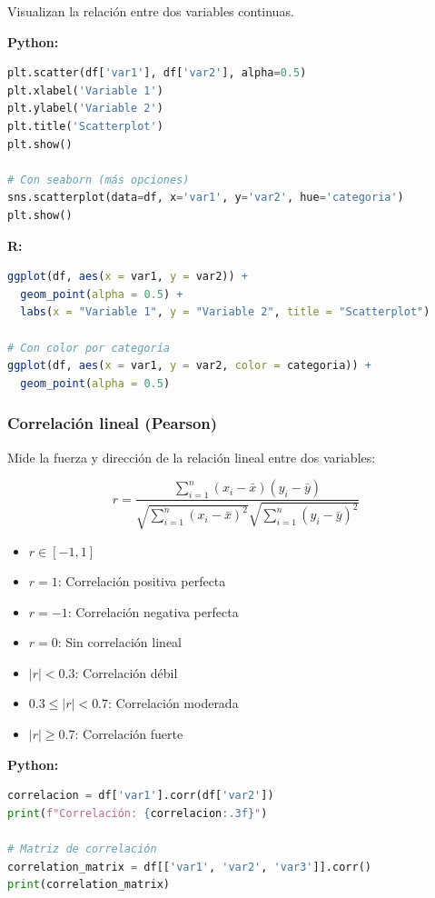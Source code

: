 \documentclass[a4paper,11pt]{article}
\begin{document}
Visualizan la relación entre dos variables continuas.

\textbf{Python:}
\begin{lstlisting}[language=Python]
plt.scatter(df['var1'], df['var2'], alpha=0.5)
plt.xlabel('Variable 1')
plt.ylabel('Variable 2')
plt.title('Scatterplot')
plt.show()

# Con seaborn (más opciones)
sns.scatterplot(data=df, x='var1', y='var2', hue='categoria')
plt.show()
\end{lstlisting}

\textbf{R:}
\begin{lstlisting}[language=R]
ggplot(df, aes(x = var1, y = var2)) +
  geom_point(alpha = 0.5) +
  labs(x = "Variable 1", y = "Variable 2", title = "Scatterplot")

# Con color por categoría
ggplot(df, aes(x = var1, y = var2, color = categoria)) +
  geom_point(alpha = 0.5)
\end{lstlisting}

\subsubsection{Correlación lineal (Pearson)}

Mide la fuerza y dirección de la relación lineal entre dos variables:

$$r = \frac{\sum_{i=1}^{n}(x_i - \bar{x})(y_i - \bar{y})}{\sqrt{\sum_{i=1}^{n}(x_i - \bar{x})^2}\sqrt{\sum_{i=1}^{n}(y_i - \bar{y})^2}}$$

\begin{itemize}
    \item $r \in [-1, 1]$
    \item $r = 1$: Correlación positiva perfecta
    \item $r = -1$: Correlación negativa perfecta
    \item $r = 0$: Sin correlación lineal
    \item $|r| < 0.3$: Correlación débil
    \item $0.3 \leq |r| < 0.7$: Correlación moderada
    \item $|r| \geq 0.7$: Correlación fuerte
\end{itemize}

\textbf{Python:}
\begin{lstlisting}[language=Python]
correlacion = df['var1'].corr(df['var2'])
print(f"Correlación: {correlacion:.3f}")

# Matriz de correlación
correlation_matrix = df[['var1', 'var2', 'var3']].corr()
print(correlation_matrix)
\end{lstlisting}
\end{document}
